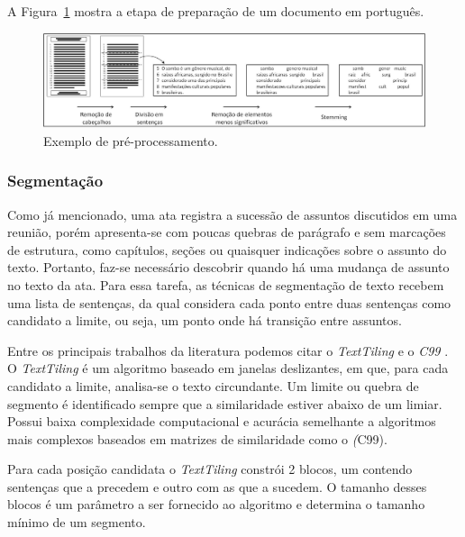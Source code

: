 A Figura~\ref{fig:exemplopreprocessamento} mostra a etapa de preparação de um documento em português.
	


  \begin{figure}
	\centering
	\includegraphics[width=1\textwidth]{conteudo/capitulos/figs/pre-processamento.jpg}
	\caption{Exemplo de pré-processamento.}
	\label{fig:exemplopreprocessamento}
  \end{figure}



\subsubsection{Segmentação}


Como já mencionado, uma ata registra a sucessão de assuntos discutidos em uma reunião, porém apresenta-se com poucas quebras de parágrafo e sem marcações de estrutura, como capítulos, seções ou quaisquer indicações sobre o assunto do texto. Portanto, faz-se necessário descobrir quando há uma mudança de assunto no texto da ata. Para essa tarefa, as técnicas de segmentação de texto recebem uma lista de sentenças, da qual considera cada ponto entre duas sentenças como candidato a limite, ou seja, um ponto onde há transição entre assuntos. 


Entre os principais trabalhos da literatura podemos citar o  \textit{TextTiling} %
e o \textit{C99}%
.
% 
O \textit{TextTiling} é um algoritmo baseado em janelas deslizantes, em  que, para cada candidato a limite, analisa-se o texto circundante. Um limite ou quebra de segmento é identificado sempre que a similaridade estiver abaixo de um limiar. Possui baixa complexidade computacional e acurácia semelhante a algoritmos mais complexos baseados em matrizes de similaridade como o \textit(C99).

Para cada posição candidata o \textit{TextTiling} constrói 2 blocos, um contendo sentenças que a precedem e outro com as que a sucedem. O tamanho desses blocos é um parâmetro a ser fornecido ao algoritmo e determina o tamanho mínimo de um segmento.

